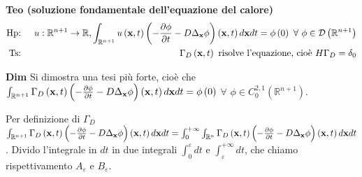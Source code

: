 \documentclass{article}
\begin{document}
\textbf{Teo (soluzione fondamentale dell'equazione del calore)}%
\begin{eqnarray*}
\text{Hp}\text{: } &&u:%
\mathbb{R}
^{n+1}\rightarrow 
\mathbb{R}
,\int_{%
\mathbb{R}
^{n+1}}u\left( \mathbf{x},t\right) \left( -\frac{\partial \phi }{\partial t}%
-D\Delta _{\mathbf{x}}\phi \right) \left( \mathbf{x},t\right) d\mathbf{x}%
dt=\phi \left( 0\right) \text{ }\forall \text{ }\phi \in \mathcal{D}\left( 
\mathbb{R}
^{n+1}\right) \\
\text{Ts}\text{: } &&\Gamma _{D}\left( \mathbf{x},t\right) \text{ risolve
l'equazione, cio\`{e} }H\Gamma _{D}=\delta _{0}
\end{eqnarray*}

\textbf{Dim} Si dimostra una tesi pi\`{u} forte, cio\`{e} che $\int_{%
\mathbb{R}
^{n+1}}\Gamma _{D}\left( \mathbf{x},t\right) \left( -\frac{\partial \phi }{%
\partial t}-D\Delta _{\mathbf{x}}\phi \right) \left( \mathbf{x},t\right) d%
\mathbf{x}dt=\phi \left( 0\right) $ $\forall $ $\phi \in C_{0}^{2,1}\left( 
\mathbb{R}
^{n+1}\right) $.

Per definizione di $\Gamma _{D}$ $\int_{%
\mathbb{R}
^{n+1}}\Gamma _{D}\left( \mathbf{x},t\right) \left( -\frac{\partial \phi }{%
\partial t}-D\Delta _{\mathbf{x}}\phi \right) \left( \mathbf{x},t\right) d%
\mathbf{x}dt=\int_{0}^{+\infty }\int_{%
\mathbb{R}
^{n}}\Gamma _{D}\left( \mathbf{x},t\right) \left( -\frac{\partial \phi }{%
\partial t}-D\Delta _{\mathbf{x}}\phi \right) \left( \mathbf{x},t\right) d%
\mathbf{x}dt$. Divido l'integrale in $dt$ in due integrali $%
\int_{0}^{\varepsilon }dt$ e $\int_{\varepsilon }^{+\infty }dt$, che chiamo
rispettivamento $A_{\varepsilon }$ e $B_{\varepsilon }$.
\end{document}
